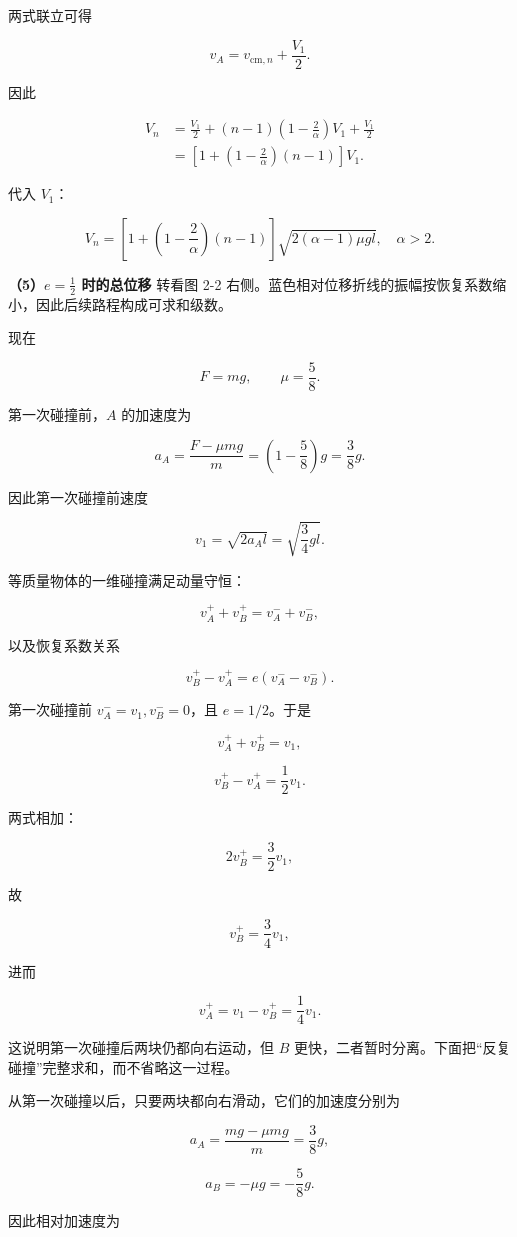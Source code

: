 \documentclass[12pt,a4paper,UTF8]{ctexart}
\begin{document}
两式联立可得

\[v_A=v_{\mathrm{cm},n}+\frac{V_1}{2}.\]

因此

\[\begin{aligned}
V_n
&=\frac{V_1}{2}
+(n-1)\left(1-\frac2\alpha\right)V_1
+\frac{V_1}{2}\\
&=\left[
1+\left(1-\frac2\alpha\right)(n-1)
\right]V_1.
\end{aligned}\]

代入 \(V_1\)：

\[\boxed{
V_n=
\left[
1+\left(1-\frac2\alpha\right)(n-1)
\right]
\sqrt{2(\alpha-1)\mu gl},
\quad \alpha>2
}.\]

\textbf{（5）\(e=\tfrac12\) 时的总位移} 转看图 2-2
右侧。蓝色相对位移折线的振幅按恢复系数缩小，因此后续路程构成可求和级数。

现在

\[F=mg,\qquad \mu=\frac58.\]

第一次碰撞前，\(A\) 的加速度为

\[a_A=\frac{F-\mu mg}{m}
=\left(1-\frac58\right)g
=\frac38g.\]

因此第一次碰撞前速度

\[v_1=\sqrt{2a_Al}
=\sqrt{\frac34gl}.\]

等质量物体的一维碰撞满足动量守恒：

\[v_A^++v_B^+=v_A^-+v_B^-,\]

以及恢复系数关系

\[v_B^+-v_A^+
=e(v_A^--v_B^-).\]

第一次碰撞前 \(v_A^-=v_1,v_B^-=0\)，且 \(e=1/2\)。于是

\[v_A^++v_B^+=v_1,\]

\[v_B^+-v_A^+=\frac12v_1.\]

两式相加：

\[2v_B^+=\frac32v_1,\]

故

\[v_B^+=\frac34v_1,\]

进而

\[v_A^+=v_1-v_B^+=\frac14v_1.\]

这说明第一次碰撞后两块仍都向右运动，但 \(B\)
更快，二者暂时分离。下面把``反复碰撞''完整求和，而不省略这一过程。

从第一次碰撞以后，只要两块都向右滑动，它们的加速度分别为

\[a_A=\frac{mg-\mu mg}{m}=\frac38g,\]

\[a_B=-\mu g=-\frac58g.\]

因此相对加速度为
\end{document}

